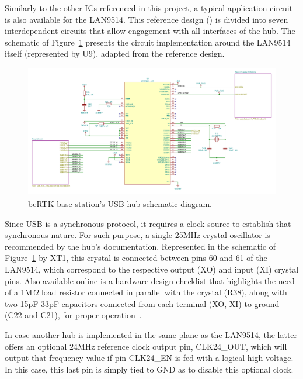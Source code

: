 Similarly to the other ICs referenced in this project, a typical application circuit is also available for the LAN9514. This reference design (\cite{LAN9514_ref_schematic}) is divided into seven interdependent circuits that allow engagement with all interfaces of the hub. The schematic of Figure~\ref{fig:USB_Hub_1_circuit} presents the circuit implementation around the LAN9514 itself (represented by U9), adapted from the reference design.

\begin{figure}[h]
	\centering
	\includegraphics[width=1.0\textwidth]{Chapters/Figures/chapter3/USB_Hub_1.pdf}
	\caption{beRTK\textsuperscript{\textregistered} base station's USB hub schematic diagram.}
	\label{fig:USB_Hub_1_circuit}
\end{figure}

Since USB is a synchronous protocol, it requires a clock source to establish that synchronous nature. For such purpose, a single 25MHz crystal oscillator is recommended by the hub's documentation. Represented in the schematic of Figure~\ref{fig:USB_Hub_1_circuit} by XT1, this crystal is connected between pins 60 and 61 of the LAN9514, which correspond to the respective output (XO) and input (XI) crystal pins. Also available online is a hardware design checklist that highlights the need of a 1M$\Omega$ load resistor connected in parallel with the crystal (R38), along with two 15pF-33pF capacitors connected from each terminal (XO, XI) to ground (C22 and C21), for proper operation~\cite{LAN9514_HW_Design_Checklist}.

In case another hub is implemented in the same plane as the LAN9514, the latter offers an optional 24MHz reference clock output pin, CLK24\_OUT, which will output that frequency value if pin CLK24\_EN is fed with a logical high voltage. In this case, this last pin is simply tied to GND as to disable this optional clock.

